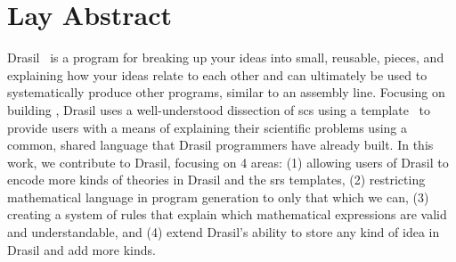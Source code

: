 \chapter{Lay Abstract}
\label{chap:lay_abstract}

Drasil~\cite{Drasil2021} is a program for breaking up your ideas into small,
reusable, pieces, and explaining how your ideas relate to each other and can
ultimately be used to systematically produce other programs, similar to an
assembly line. Focusing on building , Drasil uses a well-understood
dissection of \acs{scs} using a  template~\cite{SmithAndLai2005} to
provide users with a means of explaining their scientific problems using a
common, shared language that Drasil programmers have already built. In this
work, we contribute to Drasil, focusing on 4 areas: (1) allowing users of Drasil
to encode more kinds of theories in Drasil and the \acs{srs} templates, (2)
restricting mathematical language in program generation to only that which we
can, (3) creating a system of rules that explain which mathematical expressions
are valid and understandable, and (4) extend Drasil's ability to store any kind
of idea in Drasil and add more kinds.
